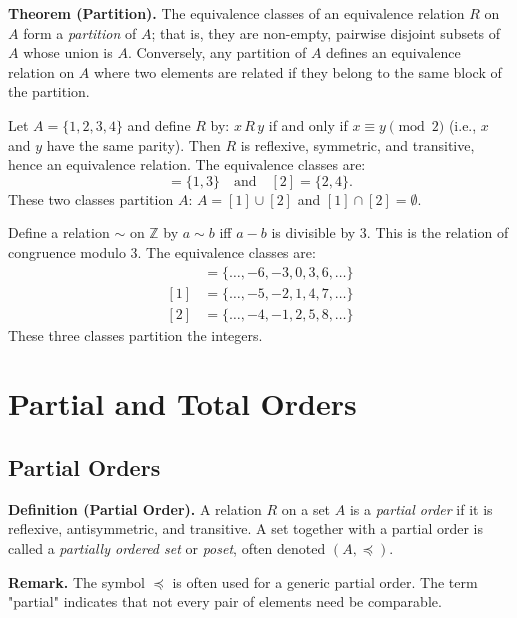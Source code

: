 \documentclass[11pt,a4paper]{article}
\begin{document}
\textbf{Theorem (Partition).} The equivalence classes of an equivalence relation $R$ on $A$ form a \textit{partition} of $A$; that is, they are non-empty, pairwise disjoint subsets of $A$ whose union is $A$. Conversely, any partition of $A$ defines an equivalence relation on $A$ where two elements are related if they belong to the same block of the partition.

\begin{example}
Let $A = \{1, 2, 3, 4\}$ and define $R$ by: $x \, R \, y$ if and only if $x \equiv y \pmod{2}$ (i.e., $x$ and $y$ have the same parity). Then $R$ is reflexive, symmetric, and transitive, hence an equivalence relation. The equivalence classes are:
\begin{equation*}
    [1] = \{1, 3\} \quad \text{and} \quad [2] = \{2, 4\}.
\end{equation*}
These two classes partition $A$: $A = [1] \cup [2]$ and $[1] \cap [2] = \emptyset$.
\end{example}

\begin{example}
Define a relation $\sim$ on $\mathbb{Z}$ by $a \sim b$ iff $a - b$ is divisible by $3$. This is the relation of congruence modulo $3$. The equivalence classes are:
\begin{align*}
    [0] &= \{\dots, -6, -3, 0, 3, 6, \dots\} \\
    [1] &= \{\dots, -5, -2, 1, 4, 7, \dots\} \\
    [2] &= \{\dots, -4, -1, 2, 5, 8, \dots\}
\end{align*}
These three classes partition the integers.
\end{example}

\section{Partial and Total Orders}

\subsection{Partial Orders}

\textbf{Definition (Partial Order).} A relation $R$ on a set $A$ is a \textit{partial order} if it is reflexive, antisymmetric, and transitive. A set together with a partial order is called a \textit{partially ordered set} or \textit{poset}, often denoted $(A, \preceq)$.

\textbf{Remark.} The symbol $\preceq$ is often used for a generic partial order. The term "partial" indicates that not every pair of elements need be comparable.
\end{document}
